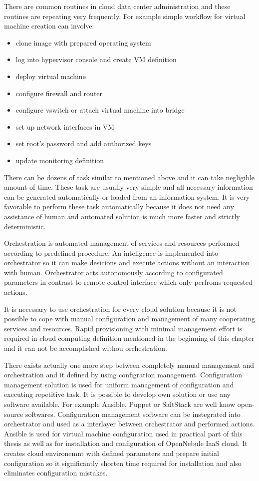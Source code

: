 
There are common routines in cloud data center administration and these routines are repeating very frequently. For example simple workflow for virtual machine creation can involve:
\begin{itemize}
	\item clone image with prepared operating system
	\item log into hypervisor console and create \Ac{VM} definition
	\item deploy virtual machine 
	\item configure firewall and router 
	\item configure vswitch or attach virtual machine into bridge
	\item set up network interfaces in \Ac{VM}
	\item set root's password and add authorized keys
	\item update monitoring definition
\end{itemize}

There can be dozens of task similar to mentioned above and it can take negligible amount of time. These task are usually very simple and all necessary information can be generated automatically or loaded from an information system. It is very favorable to perform these task automatically because it does not need any assistance of human and automated solution is much more faster and strictly deterministic.

Orchestration is automated management of services and resources performed according to predefined procedure. An inteligence is implemented into orchestrator so it can make desicions and execute actions without an interaction with human. Orchestrator acts autonomously according to configurated parameters in contrast to remote control interface which only perfroms requested actions.

It is necessary to use orchestration for every cloud solution because it is not possible to cope with manual configuration and management of many cooperating services and resources. Rapid provisioning with minimal management effort is required in cloud computing definition mentioned in the beginning of this chapter and it can not be accomplished withou orchestration.

There exists actually one more step between completely manual management and orchestration and it defined by using configration management. Configuration management solution is used for uniform management of configuration and executing repetitive task. It is possible to develop own solution or use any software available. For example Ansible, Puppet or SaltStack are well know open-source softwares. Configuration management software can be instegrated into orchestrator and used as a interlayer between orchestrator and performed actions.
Ansible is used for virtual machine configuration used in practical part of this thesis as well as for installation and configuration of OpenNebule IaaS cloud. It creates cloud environemnt with defined parameters and prepare initial configuration so it significantly shorten time required for installation and also eliminates configuration mistakes.  

